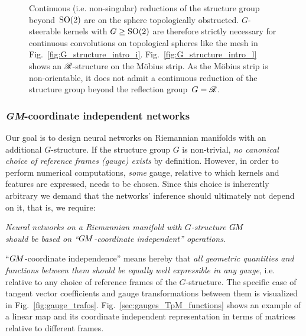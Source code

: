 {\begin{figure}
{        Continuous (i.e. non-singular) reductions of the structure group beyond~$\operatorname{SO}(2)$ are on the sphere topologically obstructed.
        $G$-steerable kernels with $G\geq\operatorname{SO}(2)$ are therefore strictly necessary for continuous convolutions on topological spheres like the mesh in Fig.~\ref{fig:G_structure_intro_i}.
        Fig.~\ref{fig:G_structure_intro_l} shows an $\mathscr{R}$-structure on the M\"obius strip.
        As the M\"obius strip is non-orientable, it does not admit a continuous reduction of the structure group beyond the reflection group~$G=\mathscr{R}$.
    }
    \label{fig:G_structures_intro}
\end{figure}
\thispagestyle{empty}
\clearpage %
}




\subsubsection{\textit{GM}-coordinate independent networks}
Our goal is
to design neural networks on Riemannian manifolds with an additional $G$-structure.
If the structure group $G$ is non-trivial, \emph{no canonical choice of reference frames (gauge) exists} by definition.
However, in order to perform numerical computations, \emph{some} gauge, relative to which kernels and features are expressed, needs to be chosen.
Since this choice is inherently arbitrary we demand that the networks' inference should ultimately not depend on it, that is, we require:
\begin{center}\it
    Neural networks on a Riemannian manifold with $G$-structure $G\mkern-1.4muM$ \\
    should be based on ``$G\mkern-1.4muM$-coordinate independent'' operations.
\end{center}
``$G\mkern-1.4muM$-coordinate independence'' means hereby that \emph{all geometric quantities and functions between them should be equally well expressible in any gauge}, i.e. relative to any choice of reference frames of the $G$-structure.
The specific case of tangent vector coefficients and gauge transformations between them is visualized in Fig.~\ref{fig:gauge_trafos}.
Fig.~\ref{sec:gauges_TpM_functions} shows an example of a linear map and its coordinate independent representation in terms of matrices relative to different frames.


